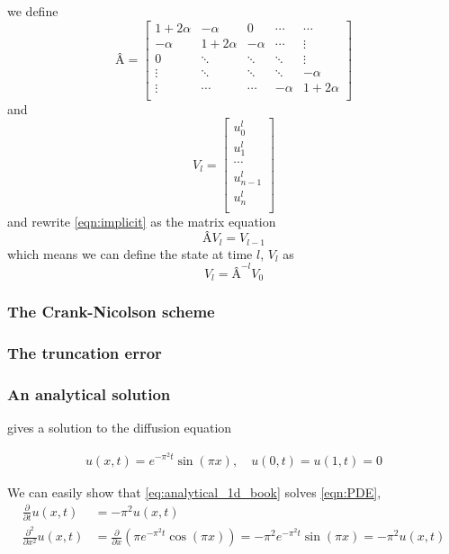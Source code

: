 \documentclass[10pt,a4paper]{article}
\newcommand{\fracpt}{\frac{\partial}{\partial t}}
\newcommand{\fracpx}{\frac{\partial}{\partial x}}
\newcommand{\fracpxx}{\frac{\partial^2}{\partial x^2}}
\begin{document}
we define
\[
Â = \begin{bmatrix}
1+2\alpha & -\alpha & 0 & \cdots & \cdots \\
-\alpha & 1+2\alpha & -\alpha & \cdots & \vdots \\
0 & \ddots & \ddots & \ddots & \vdots \\
\vdots & \ddots & \ddots & \ddots & -\alpha \\
\vdots & \cdots & \cdots & -\alpha & 1+2\alpha \\
\end{bmatrix}
\]
and
\[ V_l = \begin{bmatrix}
u_{0}^l\\
u_{1}^l\\
\cdots\\
u_{n-1}^l\\
u_{n}^l\\
\end{bmatrix}
\]
and rewrite \ref{eqn:implicit} as the matrix equation
\begin{equation}
ÂV_l = V_{l-1}
\end{equation}
which means we can define the state at time $l$, $V_l$ as
\begin{equation}
V_l = Â^{-l}V_0
\end{equation}


\subsubsection{The Crank-Nicolson scheme}


\subsubsection{The truncation error}


\subsubsection{An analytical solution}\label{sec:analytical_1d}
\cite{inf-mat2351_book} gives a solution to the diffusion equation

\begin{align}\label{eq:analytical_1d_book}
    u(x, t) = e^{-\pi^2 t} \sin(\pi x) , \quad u(0, t) = u(1, t) = 0
\end{align}

We can easily show that \vref{eq:analytical_1d_book} solves \vref{eqn:PDE},
\begin{align}
\fracpt u(x, t) &= -\pi^2 u(x, t) \\
\fracpxx u(x, t) &= \fracpx \left(\pi e^{-\pi^2 t} \cos(\pi x) \right)
= -\pi^2 e^{-\pi^2 t} \sin(\pi x) = -\pi^2 u(x, t)
\end{align}
\end{document}
